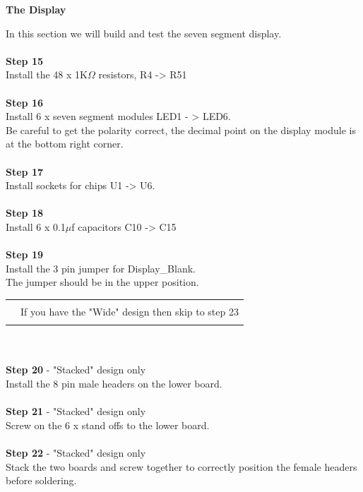 \documentclass{ol-softwaremanual}
\newcommand{\Note}[1]{
\begin{table}[h]
\begin{tabular}{|p{0.1\textwidth}p{0.8\textwidth}|}
\hline
 & \\
\multicolumn{1}{|r}{\Huge\warning} & #1\\
 &  \\ \hline
\end{tabular}
\end{table}
}
\begin{document}
\begin{ffcode}
\begin{center}
\textbf{The Display}
\end{center}
In this section we will build and test the seven segment display.\\
\\
\textbf{Step 15}\\
Install the 48 x 1K$\Omega$ resistors, R4 -> R51\\
\\
\textbf{Step 16}\\
Install 6 x seven segment modules LED1 - > LED6.\\
Be careful to get the polarity correct, the decimal point on the display module is at the bottom right corner.\\
\\
\textbf{Step 17}\\
Install sockets for chips U1 -> U6.\\
\\
\textbf{Step 18}\\
Install 6 x 0.1$\mu$f capacitors C10 -> C15\\
\\
\textbf{Step 19}\\
Install the 3 pin jumper for Display\_Blank.\\
The jumper should be in the upper position.
\Note{If you have the "Wide" design then skip to step 23}\\
\\
\textbf{Step 20} - "Stacked" design only\\
Install the 8 pin male headers on the lower board.\\
\\
\textbf{Step 21} - "Stacked" design only\\
Screw on the 6 x stand offs to the lower board.\\
\\
\textbf{Step 22} - "Stacked" design only\\
Stack the two boards and screw together to correctly position the female headers before soldering.\\
\pagebreak


\end{ffcode}
\end{document}
